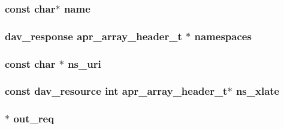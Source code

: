 \subsubsection[{\texorpdfstring{name}{name}}]{\setlength{\rightskip}{0pt plus 5cm}const char$\ast$ name}\hypertarget{group__MOD__DAV_ga8f8f80d37794cde9472343e4487ba3eb}{}\label{group__MOD__DAV_ga8f8f80d37794cde9472343e4487ba3eb}
\subsubsection[{\texorpdfstring{namespaces}{namespaces}}]{ {\bf dav\+\_\+response} {\bf apr\+\_\+array\+\_\+header\+\_\+t} $\ast$ namespaces}\hypertarget{group__MOD__DAV_ga693d7e57299e41429256463b6978cfd6}{}\label{group__MOD__DAV_ga693d7e57299e41429256463b6978cfd6}
\subsubsection[{\texorpdfstring{ns\+\_\+uri}{ns_uri}}]{\setlength{\rightskip}{0pt plus 5cm}const char $\ast$ ns\+\_\+uri}\hypertarget{group__MOD__DAV_ga08d1a5845fd4b9e4370e9423ecb88d75}{}\label{group__MOD__DAV_ga08d1a5845fd4b9e4370e9423ecb88d75}
\subsubsection[{\texorpdfstring{ns\+\_\+xlate}{ns_xlate}}]{ const {\bf dav\+\_\+resource} {\bf int} {\bf apr\+\_\+array\+\_\+header\+\_\+t}$\ast$ ns\+\_\+xlate}\hypertarget{group__MOD__DAV_gaa25c4e4aa77339ae2c25aeca085180c7}{}\label{group__MOD__DAV_gaa25c4e4aa77339ae2c25aeca085180c7}
\subsubsection[{\texorpdfstring{out\+\_\+req}{out_req}}]{$\ast$ out\+\_\+req}\hypertarget{group__MOD__DAV_ga88f1c33cbfbc8da7746840cffd827b59}{}\label{group__MOD__DAV_ga88f1c33cbfbc8da7746840cffd827b59}
